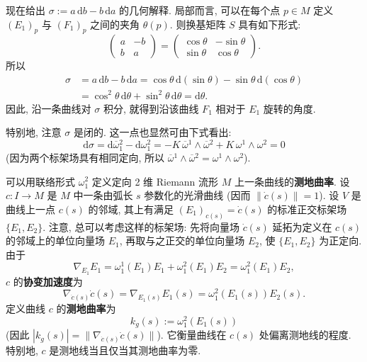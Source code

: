现在给出 $\sigma:=a\,\mathrm{d}b-b\,\mathrm{d}a$ 的几何解释. 局部而言, 可以在每个点 $p\in M$ 定义 $(E_1)_p$ 与 $(F_1)_p$ 之间的夹角 $\theta(p)$. 则换基矩阵 $S$ 具有如下形式:
\[
  \begin{pmatrix}a&-b\\b&a\end{pmatrix}
  =\begin{pmatrix}\cos\theta&-\sin\theta\\\sin\theta&\cos\theta\end{pmatrix}.
\]
所以
\begin{align*}
  \sigma&=a\,\mathrm{d}b-b\,\mathrm{d}a
   =\cos\theta\,\mathrm{d}(\sin\theta)-\sin\theta\,\mathrm{d}(\cos\theta)\\
  &=\cos^2\theta\,\mathrm{d}\theta+\sin^2\theta\,\mathrm{d}\theta=\mathrm{d}\theta.
\end{align*}
因此, 沿一条曲线对 $\sigma$ 积分, 就得到沿该曲线 $F_1$ 相对于 $E_1$ 旋转的角度.

特别地, 注意 $\sigma$ 是闭的. 这一点也显然可由下式看出:
\[
  \mathrm{d}\sigma=\mathrm{d}\overline\omega{}_1^2-\mathrm{d}\omega_1^2
  =-K\,\overline\omega{}^1\wedge\overline\omega{}^2+K\,\omega^1\wedge\omega^2=0
\]
(因为两个标架场具有相同定向, 所以 $\overline\omega{}^1\wedge\overline\omega{}^2=\omega^1\wedge\omega^2$).

可以用联络形式 $\omega_1^2$ 定义定向 2 维 Riemann 流形 $M$ 上一条曲线的\textbf{测地曲率}. 设 $c:I\to M$ 是 $M$ 中一条由弧长 $s$ 参数化的光滑曲线 (因而 $\lVert\dot c(s)\rVert=1$). 设 $V$ 是曲线上一点 $c(s)$ 的邻域, 其上有满足 $(E_1)_{c(s)}=\dot c(s)$ 的标准正交标架场 $\{E_1,E_2\}$. 注意, 总可以考虑这样的标架场: 先将向量场 $\dot c(s)$ 延拓为定义在 $c(s)$ 的邻域上的单位向量场 $E_1$, 再取与之正交的单位向量场 $E_2$, 使 $\{E_1,E_2\}$ 为正定向. 由于
\[
  \nabla_{E_1}E_1=\omega_1^1(E_1)E_1+\omega_1^2(E_1)E_2=\omega_1^2(E_1)E_2,
\]
$c$ 的\label{idx:covariant-acceleration}\textbf{协变加速度}为
\[
  \nabla_{\dot c(s)}\dot c(s)=\nabla_{E_1(s)}E_1(s)=\omega_1^2(E_1(s))E_2(s).
\]
定义曲线 $c$ 的\textbf{测地曲率}为
\[
  k_g(s):=\omega_1^2(E_1(s))
\]
(因此 $|k_g(s)|=\lVert\nabla_{\dot c(s)}\dot c(s)\rVert$). 它衡量曲线在 $c(s)$ 处偏离测地线的程度. 特别地, $c$ 是测地线当且仅当其测地曲率为零.

